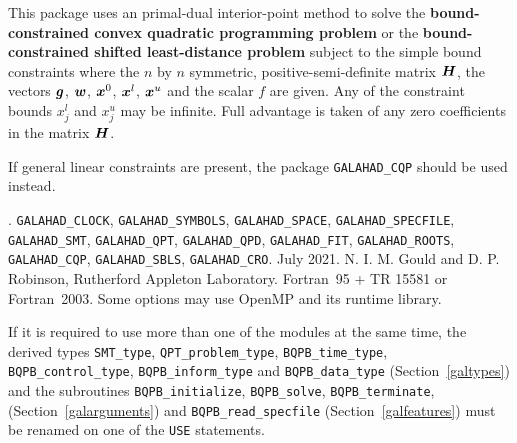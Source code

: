 \documentclass{galahad}
\newcommand{\packagename}{BQPB}
\newcommand{\fullpackagename}{\libraryname\_\packagename}
\begin{document}
\galheader


\galsummary
This package uses an primal-dual interior-point method
to solve the {\bf bound-constrained convex quadratic programming problem}
or the {\bf bound-constrained shifted least-distance problem}
subject to the simple bound constraints
where the $n$ by $n$ symmetric, positive-semi-definite matrix ${\bm{H}}$, the
vectors ${\bm{g}}$, ${\bm{w}}$, ${\bm{x}}^{0}$, ${\bm{x}}^{l}$,
${\bm{x}}^{u}$ and the scalar $f$ are given. Any of the constraint bounds 
$x_{j}^{l}$ and $x_{j}^{u}$ may be infinite.
Full advantage is taken of any zero coefficients in the matrix ${\bm{H}}$.

If general linear constraints are present, the package 
{\tt GALAHAD\_CQP} should be used instead.


\galattributes
\galversions{\tt  \fullpackagename\_single, \fullpackagename\_double}.
\galuses
{\tt GALAHAD\_CLOCK},
{\tt GALAHAD\_SY\-M\-BOLS},
{\tt GALAHAD\-\_SPACE},
{\tt GALAHAD\_SPECFILE},
{\tt GALAHAD\_SMT},
{\tt GALAHAD\_QPT},
{\tt GALAHAD\_\-QPD},
{\tt GALAHAD\_\-FIT},
{\tt GALAHAD\_\-ROOTS},
{\tt GALAHAD\_\-CQP},
{\tt GALAHAD\_\-SBLS},
{\tt GALAHAD\_\-CRO}.
\galdate July 2021.
\galorigin N. I. M. Gould and D. P. Robinson, Rutherford Appleton Laboratory.
\gallanguage Fortran~95 + TR 15581 or Fortran~2003.
\galparallelism Some options may use OpenMP and its runtime library.


\galhowto




\noindent
If it is required to use more than one of the modules at the same time, 
the derived types
{\tt SMT\_type},
{\tt QPT\_problem\_type},
{\tt \packagename\_time\_type},
{\tt \packagename\_control\_type},
{\tt \packagename\_inform\_type}
and
{\tt \packagename\_data\_type}
(Section~\ref{galtypes})
and the subroutines
{\tt \packagename\_initialize},
{\tt \packagename\_\-solve},
{\tt \packagename\_terminate},
(Section~\ref{galarguments})
and
{\tt \packagename\_read\_specfile}
(Section~\ref{galfeatures})
must be renamed on one of the {\tt USE} statements.
\end{document}

